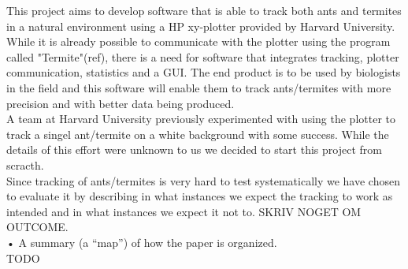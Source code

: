 This project aims to develop software that is able to track both ants and termites in a natural environment using a HP xy-plotter provided by Harvard University. While it is already possible to communicate with the plotter using the program called "Termite"(ref), there is a need for software that integrates tracking, plotter communication, statistics and a GUI. The end product is to be used by biologists in the field and this software will enable them to track ants/termites with more precision and with better data being produced.\\

A team at Harvard University previously experimented with using the plotter to track a singel ant/termite on a white background with some success. While the details of this effort were unknown to us we decided to start this project from scracth. \\

Since tracking of ants/termites is very hard to test systematically we have chosen to evaluate it by describing in what instances we expect the tracking to work as intended and in what instances we expect it not to. SKRIV NOGET OM OUTCOME. \\

• A summary (a “map”) of how the paper is organized.\\
TODO \\



